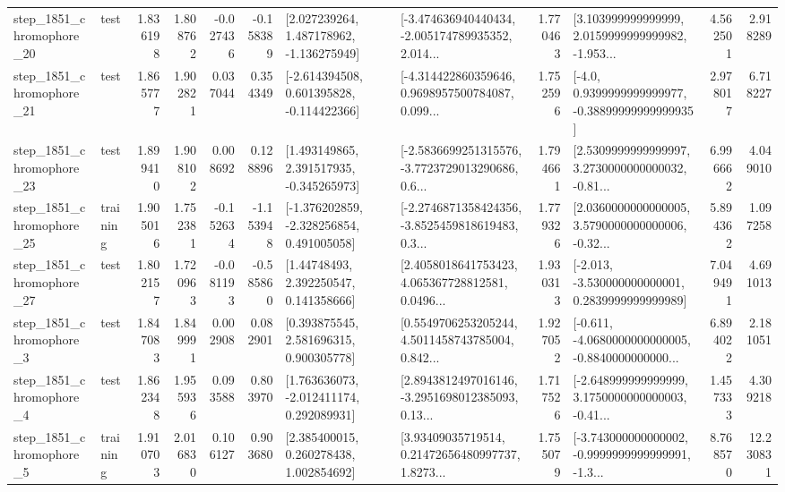 \begin{tabular}{llrrrrllrlrr}
 step\_1851\_chromophore\_20 &      test &      1.836198 &    1.808762 &     -0.027436 & -0.158389 &    [2.027239264, 1.487178962, -1.136275949] &  [-3.474636940440434, -2.005174789935352, 2.014... &       1.770463 &  [3.103999999999999, 2.0159999999999982, -1.953... &            4.562501 &          2.918289 \\
 step\_1851\_chromophore\_21 &      test &      1.865777 &    1.902821 &      0.037044 &  0.354349 &   [-2.614394508, 0.601395828, -0.114422366] &  [-4.314422860359646, 0.9698957500784087, 0.099... &       1.752596 &   [-4.0, 0.9399999999999977, -0.38899999999999935] &            2.978017 &          6.718227 \\
 step\_1851\_chromophore\_23 &      test &      1.899410 &    1.908102 &      0.008692 &  0.128896 &    [1.493149865, 2.391517935, -0.345265973] &  [-2.5836699251315576, -3.7723729013290686, 0.6... &       1.794661 &  [2.5309999999999997, 3.2730000000000032, -0.81... &            6.996662 &          4.049010 \\
 step\_1851\_chromophore\_25 &  training &      1.905016 &    1.752381 &     -0.152634 & -1.153948 &   [-1.376202859, -2.328256854, 0.491005058] &  [-2.2746871358424356, -3.8525459818619483, 0.3... &       1.779326 &  [2.0360000000000005, 3.5790000000000006, -0.32... &            5.894362 &          1.097258 \\
 step\_1851\_chromophore\_27 &      test &      1.802157 &    1.720963 &     -0.081193 & -0.585860 &      [1.44748493, 2.392250547, 0.141358666] &  [2.4058018641753423, 4.065367728812581, 0.0496... &       1.930313 &   [-2.013, -3.530000000000001, 0.2839999999999989] &            7.049491 &          4.691013 \\
  step\_1851\_chromophore\_3 &      test &      1.847083 &    1.849991 &      0.002908 &  0.082901 &     [0.393875545, 2.581696315, 0.900305778] &  [0.5549706253205244, 4.5011458743785004, 0.842... &       1.927052 &  [-0.611, -4.0680000000000005, -0.8840000000000... &            6.894022 &          2.181051 \\
  step\_1851\_chromophore\_4 &      test &      1.862348 &    1.955936 &      0.093588 &  0.803970 &    [1.763636073, -2.012411174, 0.292089931] &  [2.8943812497016146, -3.2951698012385093, 0.13... &       1.717526 &  [-2.648999999999999, 3.1750000000000003, -0.41... &            1.457333 &          4.309218 \\
  step\_1851\_chromophore\_5 &  training &      1.910703 &    2.016830 &      0.106127 &  0.903680 &     [2.385400015, 0.260278438, 1.002854692] &  [3.93409035719514, 0.21472656480997737, 1.8273... &       1.755079 &  [-3.743000000000002, -0.9999999999999991, -1.3... &            8.768570 &         12.230831 \\

\end{tabular}
